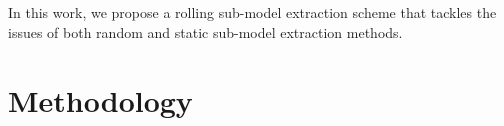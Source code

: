 \documentclass{article}
\newcommand{\MZ}[1]{\textcolor{red}{(MZ: #1)}}
\begin{document}
%
%
In this work, we propose a rolling sub-model extraction scheme that tackles the issues of both random and static sub-model extraction methods.








\vspace{-2mm}
\section{Methodology}
\label{sec:approach}
\vspace{-2mm}
\end{document}
